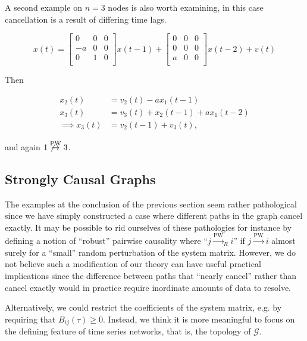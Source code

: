 \documentclass[12pt]{article}
\def\pwgc{\overset{\text{PW}}{\rightarrow}}  %
\def\gcg{\mathcal{G}}  %
\begin{document}
\begin{example}
  \label{ex:lag_cancellation}
  A second example on $n = 3$ nodes is also worth examining, in this case
  cancellation is a result of differing time lags.

\begin{equation*}
  x(t) =
  \left[
    \begin{array}{ccc}
      0 & 0 & 0\\
      -a & 0 & 0\\
      0 & 1 & 0\\
    \end{array}
  \right] x(t - 1) +
  \left[
    \begin{array}{ccc}
      0 & 0 & 0\\
      0 & 0 & 0\\
      a & 0 & 0\\
    \end{array}
  \right] x(t - 2) + v(t)
\end{equation*}

Then

\begin{align*}
  x_2(t) &= v_2(t) - ax_1(t - 1)\\
  x_3(t) &= v_3(t) + x_2(t - 1) + ax_1(t - 2)\\
  \implies x_3(t) &= v_2(t - 1) + v_3(t),
\end{align*}

and again $1 \not\pwgc 3$.
\end{example}

\subsection{Strongly Causal Graphs}
The examples at the conclusion of the previous section seem rather
pathological since we have simply constructed a case where different
paths in the graph cancel exactly.  It may be possible to rid
ourselves of these pathologies for instance by defining a notion of
``robust'' pairwise causality where ``$j \pwgc _R i$'' if $j \pwgc i$
almost surely for a ``small'' random perturbation of the system
matrix.  However, we do not believe such a modification of our theory
can have useful practical implications since the difference between
paths that ``nearly cancel'' rather than cancel exactly would in
practice require inordinate amounts of data to resolve.

Alternatively, we could restrict the coefficients of the system
matrix, e.g. by requiring that $B_{ij}(\tau) \ge 0$.  Instead, we
think it is more meaningful to focus on the defining feature of time
series networks, that is, the topology of $\gcg$.
\end{document}
